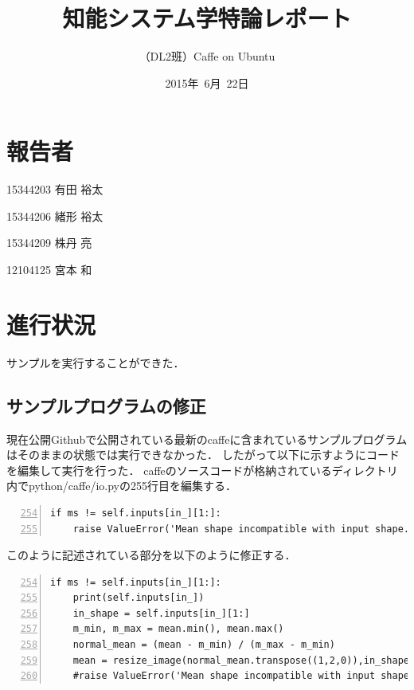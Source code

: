 \documentclass[a4paper,10pt]{jsarticle}
\title{知能システム学特論レポート}
\author{
（DL2班）Caffe on Ubuntu\\
}
\date{2015年\ 6月\ 22日}
\begin{document}
\maketitle
\section{報告者}
\begin{list}{}{}
 \item 15344203\hspace{0.5cm} 有田 裕太
 \item 15344206\hspace{0.5cm} 緒形 裕太
 \item 15344209\hspace{0.5cm} 株丹 亮
 \item 12104125\hspace{0.5cm} 宮本 和
\end{list}

\section{進行状況}
サンプルを実行することができた．

\subsection{サンプルプログラムの修正}
現在公開Githubで公開されている最新のcaffeに含まれているサンプルプログラムはそのままの状態では実行できなかった．
したがって以下に示すようにコードを編集して実行を行った．
caffeのソースコードが格納されているディレクトリ内でpython/caffe/io.pyの255行目を編集する．\\
\begin{lstlisting}[basicstyle=\ttfamily\footnotesize, frame=single, firstnumber=254, numbers=left]
if ms != self.inputs[in_][1:]:
    raise ValueError('Mean shape incompatible with input shape.')
\end{lstlisting}
このように記述されている部分を以下のように修正する．
\begin{lstlisting}[basicstyle=\ttfamily\footnotesize, frame=single, firstnumber=254, numbers=left, breaklines=true]
if ms != self.inputs[in_][1:]:
    print(self.inputs[in_])
    in_shape = self.inputs[in_][1:]
    m_min, m_max = mean.min(), mean.max()
    normal_mean = (mean - m_min) / (m_max - m_min)
    mean = resize_image(normal_mean.transpose((1,2,0)),in_shape[1:]).transpose((2,0,1)) * (m_max - m_min) + m_min
    #raise ValueError('Mean shape incompatible with input shape.')
\end{lstlisting}
\end{document}
